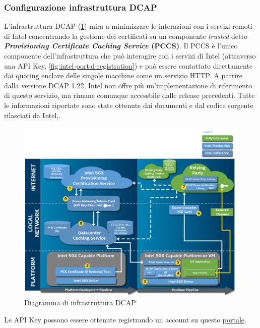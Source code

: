 \documentclass{article}
\begin{document}
\subsubsection{Configurazione infrastruttura DCAP}\label{sec:dcap-infrastructure-configuration}
L'infrastruttura DCAP (\cref{fig:dcap-infra}) mira a minimizzare le interazioni con i servizi remoti di Intel concentrando la gestione dei certificati su un componente \textit{trusted} detto \textbf{\textit{Provisioning Certificate Caching Service} (PCCS)}. Il PCCS è l'unico componente dell'infrastruttura che può interagire con i servizi di Intel (attraverso una API Key, \cref{fig:intel-portal-registration}) e può essere contattato direttamente dai quoting enclave delle singole macchine come un servizio HTTP. A partire dalla versione DCAP 1.22, Intel non offre più un'implementazione di riferimento di questo servizio, ma rimane comunque accessbile dalle release precedenti. Tutte le informazioni riportate sono state ottenute dai documenti e dal codice sorgente rilasciati da Intel\cite{sgx-dcap-docs},\cite{sgx-dcap-repo}.

\begin{figure}[H]
  \begin{center}
    \includegraphics[width=.7\textwidth]{figures/ch3/dcap-infra.png}
  \end{center}
  \caption{Diagramma di infrastruttura DCAP}\label{fig:dcap-infra}
\end{figure}

Le API Key possono essere ottenute registrando un account su questo \href{https://api.portal.trustedservices.intel.com}{portale}.
\end{document}
